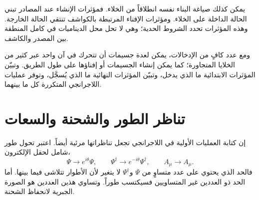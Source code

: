 \begin{classroomqa}
\end{classroomqa}

يمكن كذلك صياغة البناء نفسه انطلاقاً من الخلاء. فمؤثرات الإنشاء عند المصادر تبني الحالة الداخلة على الخلاء. ومؤثرات الإفناء المرتبطة بالكواشف تنتقي الحالة الخارجة. وهذه المؤثرات تحدد الشروط الحدية؛ وهي لا تحل محل الديناميات في كامل المنطقة بين المصدر والكاشف.

\begin{classroomqa}
\end{classroomqa}

ومع عدد كافٍ من الإدخالات، يمكن لعدة جسيمات أن تتحرك في آن واحد عبر كثير من الخلايا المتجاورة؛ كما يمكن إنشاء الجسيمات أو إفناؤها على طول الطريق. وتبيّن المؤثرات الابتدائية ما الذي يدخل، وتبيّن المؤثرات النهائية ما الذي يُسجَّل، وتوفر عمليات اللاجرانجي المتكررة كل ما بينهما.

\begin{classroomqa}
\end{classroomqa}

\section{تناظر الطور والشحنة والسعات}

إن كتابة العمليات الأولية في اللاجرانجي تجعل تناظراتها مرئية أيضاً. اعتبر تحول طور شامل لحقل الإلكترون،
\begin{equation}
\Psi\longrightarrow e^{i\theta}\Psi,
\qquad
\Psi^\dagger\longrightarrow e^{-i\theta}\Psi^\dagger,
\qquad
A_\mu\longrightarrow A_\mu.
\end{equation}
فالحد الذي يحتوي على عدد متساوٍ من \(\Psi\) و\(\Psi^\dagger\) لا يتغير لأن الأطوار تتلاشى فيما بينها. أما الحد ذو العددين غير المتساويين فسيكتسب طوراً. وتساوي هذين العددين هو الصورة الجبرية لانحفاظ الشحنة.

